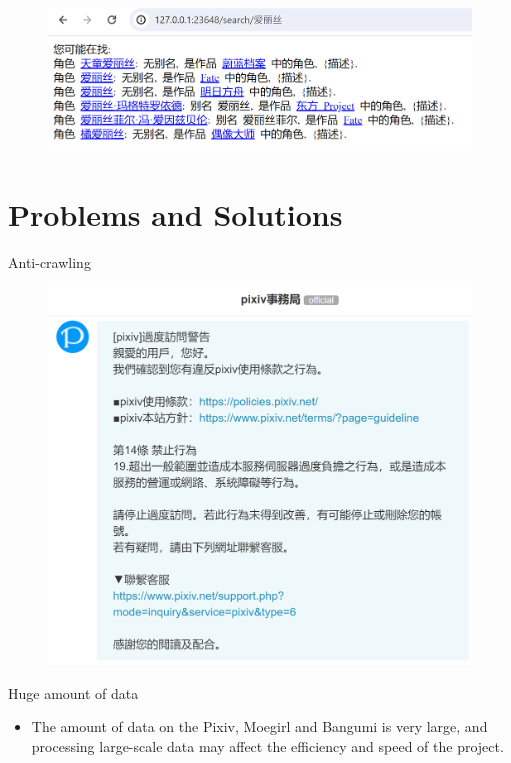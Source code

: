 \documentclass{beamer}
\begin{document}
\begin{frame}{}
    \begin{figure}[l]
        \centering
        \includegraphics[height=.5\textheight]{pic/12.png}
    \end{figure}
\end{frame}


\section{Problems and Solutions}

\begin{frame}{Anti-crawling}
    \begin{figure}[l]
        \centering
        \includegraphics[height=.8\textheight]{pic/anti.png}
    \end{figure}
\end{frame}

\begin{frame}{Huge amount of data}
    \begin{itemize}
        \item The amount of data on the Pixiv, Moegirl and Bangumi is very large, and processing large-scale data may affect the efficiency and speed of the project.
    \end{itemize}
\end{frame}
\end{document}

